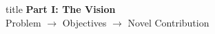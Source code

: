 \documentclass[aspectratio=169,xcolor=dvipsnames]{beamer}
\begin{document}
\begin{frame}[plain]
    \centering
    \vfill
    \begin{beamercolorbox}[center,shadow=true,rounded=true]{title}
        \textbf{Part I: The Vision}\\
        \vspace{0.5em}
        \large Problem $\to$ Objectives $\to$ Novel Contribution
    \end{beamercolorbox}
    \vfill
\end{frame}

\end{document}
